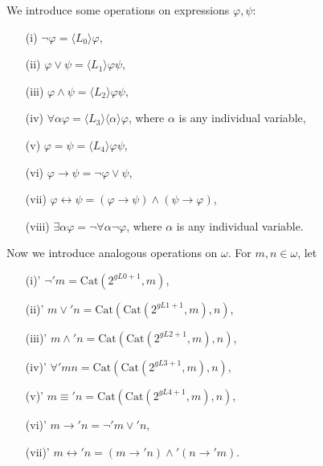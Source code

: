 We introduce some operations on expressions $\varphi, \psi$:

\begin{enumerate}
\item[(i)] $\neg \varphi = \langle L_0 \rangle \varphi$,
\item[(ii)] $\varphi \vee \psi = \langle L_1 \rangle \varphi \psi$,
\item[(iii)] $\varphi \wedge \psi = \langle L_2 \rangle \varphi \psi$,
\item[(iv)] $\forall \alpha \varphi = \langle L_3 \rangle \langle \alpha \rangle \varphi$, where $\alpha$ is any individual variable,
\item[(v)] $\varphi = \psi = \langle L_4 \rangle \varphi \psi$,
\item[(vi)] $\varphi \rightarrow \psi = \neg \varphi \vee \psi$,
\item[(vii)] $\varphi \leftrightarrow \psi = (\varphi \rightarrow \psi) \wedge (\psi \rightarrow \varphi)$,
\item[(viii)] $\exists \alpha \varphi = \neg \forall \alpha \neg \varphi$, where $\alpha$ is any individual variable.
\end{enumerate}

Now we introduce analogous operations on $\omega$. For $m, n \in \omega$, let

\begin{enumerate}
\item[(i)'] $\neg' m = \text{Cat} (2^{gL0+1}, m)$,
\item[(ii)'] $m \vee' n = \text{Cat} (\text{Cat} (2^{gL1+1}, m), n)$,
\item[(iii)'] $m \wedge' n = \text{Cat} (\text{Cat} (2^{gL2+1}, m), n)$,
\item[(iv)'] $\forall' mn = \text{Cat} (\text{Cat} (2^{gL3+1}, m), n)$,
\item[(v)'] $m \equiv' n = \text{Cat} (\text{Cat} (2^{gL4+1}, m), n)$,
\item[(vi)'] $m \rightarrow' n = \neg' m \vee' n$,
\item[(vii)'] $m \leftrightarrow' n = (m \rightarrow' n) \wedge' (n \rightarrow' m)$.
\end{enumerate}
